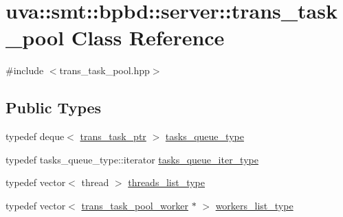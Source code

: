 \hypertarget{classuva_1_1smt_1_1bpbd_1_1server_1_1trans__task__pool}{}\section{uva\+:\+:smt\+:\+:bpbd\+:\+:server\+:\+:trans\+\_\+task\+\_\+pool Class Reference}
\label{classuva_1_1smt_1_1bpbd_1_1server_1_1trans__task__pool}


{\ttfamily \#include $<$trans\+\_\+task\+\_\+pool.\+hpp$>$}

\subsection*{Public Types}
\begin{DoxyCompactItemize}
\item 
typedef deque$<$ \hyperlink{namespaceuva_1_1smt_1_1bpbd_1_1server_a4dea4bb1185fe5d148be18ad12fea74a}{trans\+\_\+task\+\_\+ptr} $>$ \hyperlink{classuva_1_1smt_1_1bpbd_1_1server_1_1trans__task__pool_a854d6c3235224e2b976ab92b450461eb}{tasks\+\_\+queue\+\_\+type}
\item 
typedef tasks\+\_\+queue\+\_\+type\+::iterator \hyperlink{classuva_1_1smt_1_1bpbd_1_1server_1_1trans__task__pool_a9188b77cca863f71b4a8eb42ee7ffd20}{tasks\+\_\+queue\+\_\+iter\+\_\+type}
\item 
typedef vector$<$ thread $>$ \hyperlink{classuva_1_1smt_1_1bpbd_1_1server_1_1trans__task__pool_a0e3629aa32806e575a5690f7cbc78980}{threads\+\_\+list\+\_\+type}
\item 
typedef vector$<$ \hyperlink{classuva_1_1smt_1_1bpbd_1_1server_1_1trans__task__pool__worker}{trans\+\_\+task\+\_\+pool\+\_\+worker} $\ast$ $>$ \hyperlink{classuva_1_1smt_1_1bpbd_1_1server_1_1trans__task__pool_added329421092deb379f0a52935ab18b}{workers\+\_\+list\+\_\+type}
\end{DoxyCompactItemize}
